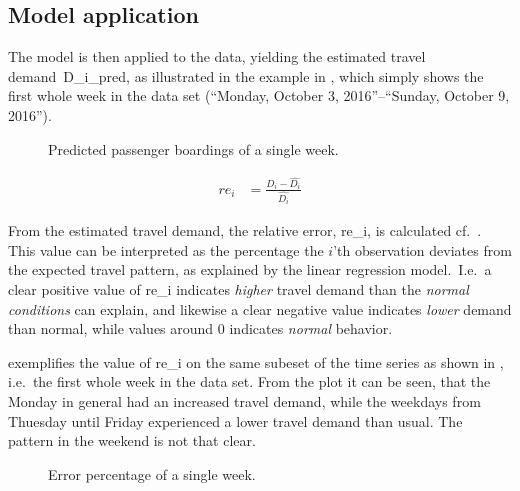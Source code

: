 \subsection{Model application}
The model is then applied to the data, yielding the estimated travel demand~\gls{D_i_pred}, as illustrated in the example in , which simply shows the first whole week in the data set (``Monday, October 3, 2016''--``Sunday, October 9, 2016'').
\begin{figure}[!ht]
    \center
    
    \vspace{-1em}
    \caption{Predicted passenger boardings of a single week.}
    \label{fig:travelcard_pred}
\end{figure}

\begin{align}
    \mathit{re}_i &= \frac{D_i - \widehat{D_i}}{\widehat{D_i}}
    \label{eq:error}
\end{align}

From the estimated travel demand, the relative error, \gls{re_i}, is calculated cf.~. This value can be interpreted as the percentage the $i$'th observation deviates from the expected travel pattern, as explained by the linear regression model.\ I.e.\ a clear positive value of \gls{re_i} indicates \emph{higher} travel demand than the \emph{normal conditions} can explain, and likewise a clear negative value indicates \emph{lower} demand than normal, while values around 0 indicates \emph{normal} behavior.


 exemplifies the value of \gls{re_i} on the same subeset of the time series as shown in , i.e.\ the first whole week in the data set. From the plot it can be seen, that the Monday in general had an increased travel demand, while the weekdays from Thuesday until Friday experienced a lower travel demand than usual. The pattern in the weekend is not that clear.

\begin{figure}[!ht]
    \center
    
    \vspace{-1em}
    \caption{Error percentage of a single week.}
    \label{fig:travelcard_error_pct}
\end{figure}